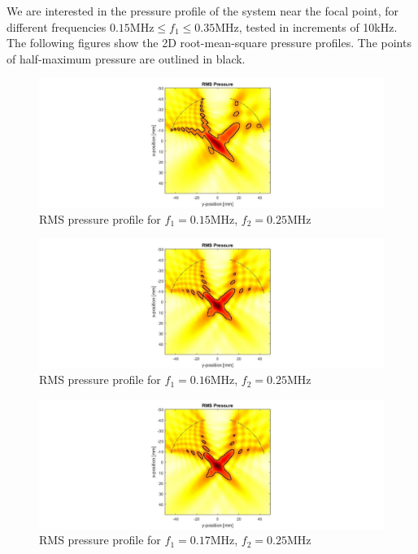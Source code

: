 \documentclass[10pt,a4paper]{article}
\begin{document}
We are interested in the pressure profile of the system near the focal point, for different frequencies $0.15 \text{MHz} \leq f_1 \leq 0.35 \text{MHz}$, tested in increments of 10kHz. The following figures show the 2D root-mean-square pressure profiles. The points of half-maximum pressure are outlined in black.

\begin{figure}[!h]\label{f150kHz}
\hspace*{-5cm}                                                    
\includegraphics[scale=0.6]{f150kHz}
\caption{RMS pressure profile for $f_1 = 0.15$MHz, $f_2 = 0.25$MHz}
\end{figure}
\begin{figure}[!h]\label{f160kHz}
\hspace*{-5cm}                                                    
\includegraphics[scale=0.6]{f160kHz}
\caption{RMS pressure profile for $f_1 = 0.16$MHz, $f_2 = 0.25$MHz}
\end{figure}
\begin{figure}[!h]\label{f170kHz}
\hspace*{-5cm}                                                    
\includegraphics[scale=0.6]{f170kHz}
\caption{RMS pressure profile for $f_1 = 0.17$MHz, $f_2 = 0.25$MHz}
\end{figure}
\end{document}
